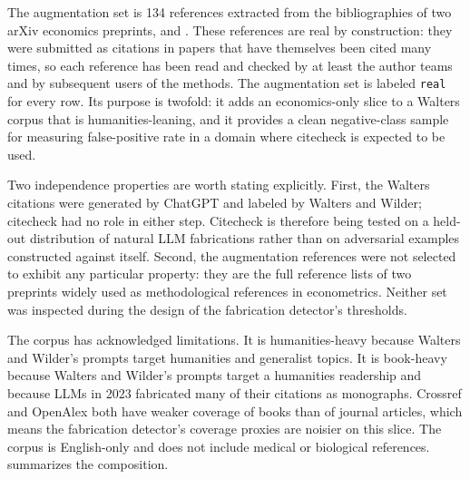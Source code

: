\documentclass[12pt]{article}
\begin{document}
The augmentation set is 134 references extracted from the bibliographies of two arXiv economics preprints, \citet{callaway_santanna_2021_preprint} and \citet{borusyak_jaravel_spiess_2024_preprint}. These references are real by construction: they were submitted as citations in papers that have themselves been cited many times, so each reference has been read and checked by at least the author teams and by subsequent users of the methods. The augmentation set is labeled \texttt{real} for every row. Its purpose is twofold: it adds an economics-only slice to a Walters corpus that is humanities-leaning, and it provides a clean negative-class sample for measuring false-positive rate in a domain where citecheck is expected to be used.

Two independence properties are worth stating explicitly. First, the Walters citations were generated by ChatGPT and labeled by Walters and Wilder; citecheck had no role in either step. Citecheck is therefore being tested on a held-out distribution of natural LLM fabrications rather than on adversarial examples constructed against itself. Second, the augmentation references were not selected to exhibit any particular property: they are the full reference lists of two preprints widely used as methodological references in econometrics. Neither set was inspected during the design of the fabrication detector's thresholds.

The corpus has acknowledged limitations. It is humanities-heavy because Walters and Wilder's prompts target humanities and generalist topics. It is book-heavy because Walters and Wilder's prompts target a humanities readership and because LLMs in 2023 fabricated many of their citations as monographs. Crossref and OpenAlex both have weaker coverage of books than of journal articles, which means the fabrication detector's coverage proxies are noisier on this slice. The corpus is English-only and does not include medical or biological references.  summarizes the composition.
\end{document}
